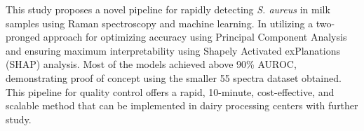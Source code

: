 
This study proposes a novel pipeline for rapidly detecting \textit{S. aureus} in milk samples using Raman spectroscopy and machine learning. In utilizing a two-pronged approach for optimizing accuracy using Principal Component Analysis and ensuring maximum interpretability using Shapely Activated exPlanations (SHAP) analysis. Most of the models achieved above 90\% AUROC, demonstrating proof of concept using the smaller 55 spectra dataset obtained. This pipeline for quality control offers a rapid, 10-minute, cost-effective, and scalable method that can be implemented in dairy processing centers with further study.

 